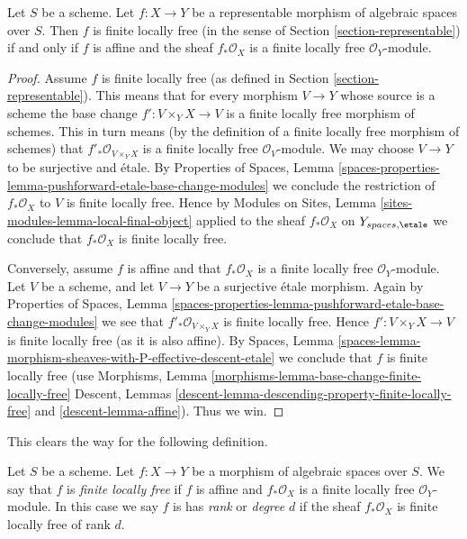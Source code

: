 \begin{lemma}
\label{lemma-finite-locally-free-representable}
Let $S$ be a scheme. Let $f : X \to Y$ be a representable morphism
of algebraic spaces over $S$. Then $f$ is finite locally free
(in the sense of Section \ref{section-representable})
if and only if $f$ is affine and the sheaf $f_*\mathcal{O}_X$ is
a finite locally free $\mathcal{O}_Y$-module.
\end{lemma}

\begin{proof}
Assume $f$ is finite locally free (as defined in
Section \ref{section-representable}). This means that
for every morphism $V \to Y$ whose source is a scheme the
base change $f' : V \times_Y X \to V$ is a finite locally free morphism
of schemes. This in turn means (by the definition of a finite locally
free morphism of schemes) that
$f'_*\mathcal{O}_{V \times_Y X}$
is a finite locally free $\mathcal{O}_V$-module. We may choose $V \to Y$
to be surjective and \'etale. By
Properties of Spaces,
Lemma \ref{spaces-properties-lemma-pushforward-etale-base-change-modules}
we conclude the restriction of $f_*\mathcal{O}_X$ to $V$ is
finite locally free. Hence by
Modules on Sites, Lemma \ref{sites-modules-lemma-local-final-object}
applied to the sheaf $f_*\mathcal{O}_X$ on $Y_{spaces, \etale}$
we conclude that $f_*\mathcal{O}_X$ is finite locally free.

\medskip\noindent
Conversely, assume $f$ is affine and that $f_*\mathcal{O}_X$ is a finite
locally free $\mathcal{O}_Y$-module. Let $V$ be a scheme, and let
$V \to Y$ be a surjective \'etale morphism. Again by
Properties of Spaces,
Lemma \ref{spaces-properties-lemma-pushforward-etale-base-change-modules}
we see that $f'_*\mathcal{O}_{V \times_Y X}$ is finite locally free.
Hence $f' : V \times_Y X \to V$ is finite locally free (as it is also affine).
By
Spaces,
Lemma \ref{spaces-lemma-morphism-sheaves-with-P-effective-descent-etale}
we conclude that $f$ is finite locally free (use
Morphisms, Lemma \ref{morphisms-lemma-base-change-finite-locally-free}
Descent, Lemmas \ref{descent-lemma-descending-property-finite-locally-free}
and \ref{descent-lemma-affine}). Thus we win.
\end{proof}

\noindent
This clears the way for the following definition.

\begin{definition}
\label{definition-finite-locally-free}
Let $S$ be a scheme.
Let $f : X \to Y$ be a morphism of algebraic spaces over $S$.
We say that $f$ is {\it finite locally free} if $f$ is affine
and $f_*\mathcal{O}_X$ is a finite locally free $\mathcal{O}_Y$-module.
In this case we say $f$ is
has {\it rank} or {\it degree} $d$
if the sheaf $f_*\mathcal{O}_X$ is finite locally free of rank $d$.
\end{definition}

